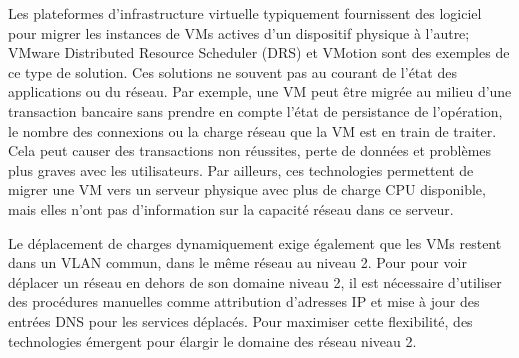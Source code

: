 Les plateformes d'infrastructure virtuelle typiquement fournissent des logiciel pour migrer les instances de VMs actives d'un dispositif physique à l'autre; VMware Distributed Resource Scheduler (DRS) et VMotion sont des exemples de ce type de solution. Ces solutions ne souvent pas au courant de l'état des applications ou du réseau. Par exemple, une VM peut être migrée au milieu d'une transaction bancaire sans prendre en compte l'état de persistance de l'opération, le nombre des connexions ou la charge réseau que la VM est en train de traiter. Cela peut causer des transactions non réussites, perte de données et problèmes plus graves avec les utilisateurs. Par ailleurs, ces technologies permettent de migrer une VM vers un serveur physique avec plus de charge CPU disponible, mais elles n'ont pas d'information sur la capacité réseau dans ce serveur.  



Le déplacement de charges dynamiquement exige également que les VMs restent dans un VLAN commun, dans le même réseau au niveau 2.  Pour pour voir déplacer un réseau en dehors de son domaine niveau 2, il est nécessaire d'utiliser des procédures manuelles comme attribution d'adresses IP et mise à jour des entrées DNS pour les services déplacés. Pour maximiser cette flexibilité, des technologies émergent pour élargir le domaine des réseau niveau 2.

